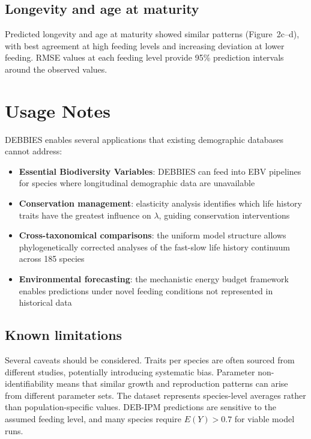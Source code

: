 \documentclass[11pt]{article}
\begin{document}
\subsection{Longevity and age at maturity}

Predicted longevity and age at maturity showed similar patterns (Figure~2c--d), with best agreement at high feeding levels and increasing deviation at lower feeding. RMSE values at each feeding level provide 95\% prediction intervals around the observed values.

\section{Usage Notes}

DEBBIES enables several applications that existing demographic databases cannot address:

\begin{itemize}
    \item \textbf{Essential Biodiversity Variables}: DEBBIES can feed into EBV pipelines for species where longitudinal demographic data are unavailable
    \item \textbf{Conservation management}: elasticity analysis identifies which life history traits have the greatest influence on $\lambda$, guiding conservation interventions
    \item \textbf{Cross-taxonomical comparisons}: the uniform model structure allows phylogenetically corrected analyses of the fast-slow life history continuum across 185 species
    \item \textbf{Environmental forecasting}: the mechanistic energy budget framework enables predictions under novel feeding conditions not represented in historical data
\end{itemize}

\subsection{Known limitations}

Several caveats should be considered. Traits per species are often sourced from different studies, potentially introducing systematic bias. Parameter non-identifiability means that similar growth and reproduction patterns can arise from different parameter sets. The dataset represents species-level averages rather than population-specific values. DEB-IPM predictions are sensitive to the assumed feeding level, and many species require $E(Y) > 0.7$ for viable model runs.


\end{document}
